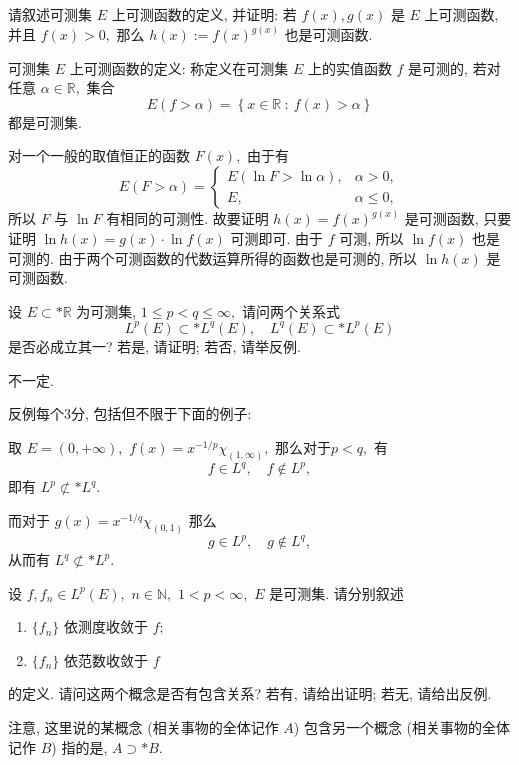 \begin{question}[points = 10]
请叙述可测集 $E$ 上可测函数的定义, 并证明: 若 $f(x), g(x)$ 是 $E$ 上可测函数, 并且 $f(x) > 0,$ 那么 $h(x) := f(x)^{g(x)}$ 也是可测函数.

\end{question}

\begin{solution}
可测集 $E$ 上可测函数的定义: 称定义在可测集 $E$ 上的实值函数 $f$ 是可测的, 若对任意 $\alpha \in \mathbb{R},$ 集合
$$
E(f > \alpha) = \left\{ x \in \mathbb{R} ~ : ~ f(x) > \alpha \right\}
$$
都是可测集. 

对一个一般的取值恒正的函数 $F(x),$ 由于有
$$
E(F > \alpha) = \begin{cases}
E( \ln F > \ln \alpha), & \alpha > 0, \\
E, & \alpha \leqslant 0,
\end{cases}
$$
所以 $F$ 与 $\ln F$ 有相同的可测性. 故要证明 $h(x) = f(x)^{g(x)}$ 是可测函数, 只要证明 $\ln h(x) = g(x) \cdot \ln f(x)$ 可测即可. 
由于 $f$ 可测, 所以 $\ln f(x)$ 也是可测的. 由于两个可测函数的代数运算所得的函数也是可测的, 所以 $\ln h(x)$ 是可测函数. 
\end{solution}

\begin{question}[points = 10]
设 $E \subset* \mathbb{R}$ 为可测集, $1 \leqslant p < q \leqslant \infty,$ 请问两个关系式
$$
L^p(E) \subset* L^q(E), \quad L^q(E) \subset* L^p(E)
$$
是否必成立其一? 若是, 请证明; 若否, 请举反例.

\end{question}

\begin{solution}
不一定. 

反例每个3分, 包括但不限于下面的例子: 

取 $E = (0, +\infty),$ $\displaystyle f(x) = x^{-1/p} \chi_{(1, \infty)},$ 那么对于$p < q,$ 有
$$
f \in L^q, \quad f \not\in L^p,
$$
即有 $L^p \not\subset* L^q.$

而对于 $\displaystyle g(x) = x^{-1/q} \chi_{(0,1)}$ 那么
$$
g \in L^p, \quad g \not\in L^q,
$$
从而有 $L^q \not\subset* L^p.$
\end{solution}

\begin{question}[points = 10]
设 $f, f_n \in L^p (E),$ $n \in \mathbb{N},$ $1 < p < \infty,$ $E$ 是可测集. 请分别叙述
\begin{enumerate}
\item $\{ f_n \}$ 依测度收敛于 $f;$
\item $\{ f_n \}$ 依范数收敛于 $f$
\end{enumerate}
的定义. 请问这两个概念是否有包含关系? 若有, 请给出证明; 若无, 请给出反例.

注意, 这里说的某概念 (相关事物的全体记作 $A$) 包含另一个概念 (相关事物的全体记作 $B$) 指的是, $A \supset* B.$

\end{question}

